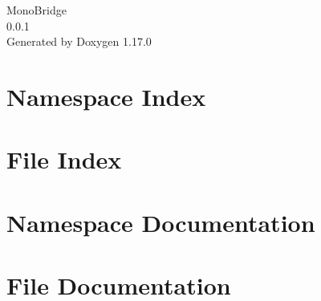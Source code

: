 \documentclass[twoside]{book}
\newcommand{\+}{\discretionary{\mbox{\scriptsize$\hookleftarrow$}}{}{}}
\newcommand{\clearemptydoublepage}{%
    \newpage{\pagestyle{empty}\cleardoublepage}%
  }
\begin{document}
  \raggedbottom
    \hypersetup{pageanchor=false,
                bookmarksnumbered=true,
                pdfencoding=unicode
               }
  \begin{titlepage}
  \vspace*{7cm}
  \begin{center}%
  {\Large Mono\+Bridge}\\
  [1ex]\large 0.\+0.\+1 \\
  \vspace*{1cm}
  {\large Generated by Doxygen 1.17.0}\\
  \end{center}
  \end{titlepage}
  \clearemptydoublepage
  \tableofcontents
  \clearemptydoublepage
  \hypersetup{pageanchor=true}
\chapter{Namespace Index}

\chapter{File Index}

\chapter{Namespace Documentation}

\chapter{File Documentation}

  \backmatter
  \newpage
  \clearemptydoublepage
  \printindex
\end{document}
